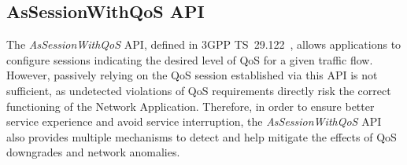 \subsection{AsSessionWithQoS \acs{API}}
\label{chap:proposal:nef:AsSessionWithQoS}

The \textit{AsSessionWithQoS} \acs{API}, defined in \acs{3GPP} TS~29.122~\cite{ETSI_TS_129_122_V18_8_0}, allows applications to configure sessions indicating the desired level of \acs{QoS} for a given traffic flow. However, passively relying on the \acs{QoS} session established via this \acs{API} is not sufficient, as undetected violations of \acs{QoS} requirements directly risk the correct functioning of the Network Application. Therefore, in order to ensure better service experience and avoid service interruption, the \textit{AsSessionWithQoS} \acs{API} also provides multiple mechanisms to detect and help mitigate the effects of \acs{QoS} downgrades and network anomalies.

